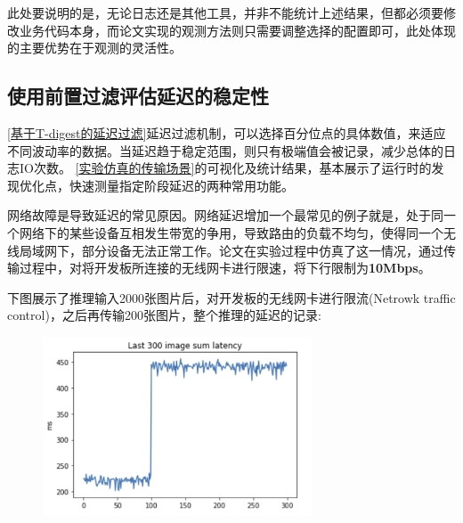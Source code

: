\documentclass[master,anonymous]{shtthesis}
\begin{document}
此处要说明的是，无论日志还是其他工具，并非不能统计上述结果，但都必须要修改业务代码本身，而论文实现的观测方法则只需要调整选择的配置即可，此处体现的主要优势在于观测的灵活性。

\subsection{使用前置过滤评估延迟的稳定性}\label{使用前置过滤评估延迟的稳定性}
\ref{基于T-digest的延迟过滤}延迟过滤机制，可以选择百分位点的具体数值，来适应不同波动率的数据。当延迟趋于稳定范围，则只有极端值会被记录，减少总体的日志IO次数。
\ref{实验仿真的传输场景}的可视化及统计结果，基本展示了运行时的发现优化点，快速测量指定阶段延迟的两种常用功能。

网络故障是导致延迟的常见原因。网络延迟增加一个最常见的例子就是，处于同一个网络下的某些设备互相发生带宽的争用，导致路由的负载不均匀，使得同一个无线局域网下，部分设备无法正常工作。论文在实验过程中仿真了这一情况，通过传输过程中，对将开发板所连接的无线网卡进行限速，将下行限制为\textbf{10Mbps}。

下图展示了推理输入2000张图片后，对开发板的无线网卡进行限流(Netrowk traffic control)，之后再传输200张图片，整个推理的延迟的记录:
\begin{figure}[H]
	\centering
	\includegraphics[width=8cm]{img/change.png}
	\label{网卡限速后延迟变化}
\end{figure}
\end{document}

